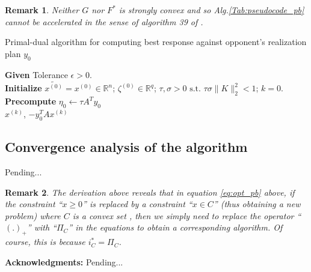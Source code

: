 \documentclass[a4paper,10pt,journal]{IEEEtran}
\newtheorem{remark}{Remark}
\begin{document}
\begin{remark}
Neither $G$ nor $F^*$ is strongly convex and so Alg.\ref{Tab:pseudocode_pb} cannot be accelerated in the sense of algorithm 39 of \cite{chambolle2010}.
\end{remark}

\begin{algorithm}[htb]
  \caption{Primal-dual algorithm for computing best response against opponent's realization plan $y_0$}
  \textbf{Given} Tolerance $\epsilon > 0$.\\
  \textbf{Initialize} $\tilde{x^{(0)}} = x^{(0)} \in \mathbb{R}^n$; $\zeta^{(0)} \in \mathbb{R}^{q}$;
  $\tau, \sigma > 0 \text{ s.t. }\tau\sigma \|K\|_2^2 < 1$; $k = 0$.\\
  \textbf{Precompute} $\eta_0 \leftarrow \tau A^Ty_0$\\
   \Return $x^{(k)}$, $-y_0^TAx^{(k)}$
  \label{Tab:pseudocode_pb}
\end{algorithm}

\subsection{Convergence analysis of the algorithm}
Pending...

\begin{remark}
The derivation above reveals that in equation \eqref{eq:opt_pb} above, if the constraint ``$x \ge 0$'' is replaced by
a constraint ``$x \in C$'' (thus obtaining a new problem) where $C$ is a convex set
, then we simply need to replace the operator ``$(.)_+$''
with ``$\Pi_C$'' in the equations to obtain a corresponding algorithm. Of course, this is because $i_C^* = \Pi_C$.
\end{remark}

\medskip \noindent
\textbf{Acknowledgments:}
Pending...

 
\end{document}
